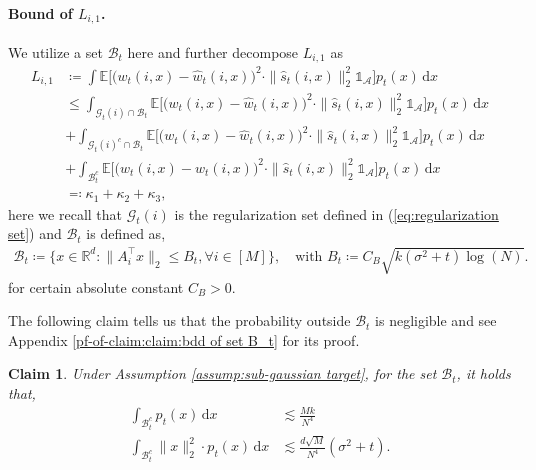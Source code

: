 \documentclass{article}
\newcommand{\ind}{\mathds{1}}
\newcommand{\defn}{\coloneqq}
\newcommand{\defnrev}{\eqqcolon}
\newcommand{\diff}{\,\mathrm{d}}
\theoremstyle{plain}
\newtheorem{claim}{\bf Claim}
\theoremstyle{remark}
\newtheorem{remark}{Remark}
\begin{document}
\paragraph*{Bound of $L_{i,1}$.}
We utilize a set $\mathcal{B}_t$ here and further decompose $L_{i,1}$ as
\begin{align*}
    L_{i,1} &\defn \int \mathbb{E} \Big[  \big(w_t(i,x)-\widehat{w}_t(i,x)\big)^2 \cdot \|\widehat{s}_t(i,x) \|_2^2 \ind_{\mathcal{A}}\Big] p_t(x) \! \diff x \\
    & \leq \int_{\mathcal{G}_{t}(i) \cap \mathcal{B}_t} \mathbb{E} \Big[  \big(w_t(i,x)-\widehat{w}_t(i,x)\big)^2 \cdot \|\widehat{s}_t(i,x) \|_2^2 \ind_{\mathcal{A}}\Big] p_t(x) \!\diff x  \\
    &+ \int_{\mathcal{G}_t(i)^c \cap \mathcal{B}_t} \mathbb{E} \Big[  \big(w_t(i,x)-\widehat{w}_t(i,x)\big)^2 \cdot \|\widehat{s}_t(i,x) \|_2^2 \ind_{\mathcal{A}}\Big] p_t(x) \!\diff x \\
    & + \int_{\mathcal{B}_t^c} \mathbb{E} \Big[  \big(w_t(i,x)-\widehat{w}_t(i,x)\big)^2 \cdot \|\widehat{s}_t(i,x) \|_2^2 \ind_{\mathcal{A}}\Big] p_t(x) \!\diff x \\
    &\defnrev \kappa_1 + \kappa_2 + \kappa_3,
\end{align*}
here we recall that $\mathcal{G}_t(i)$ is the regularization set defined in (\ref{eq:regularization set}) and $\mathcal{B}_t$ is defined as, 
\begin{align}
    \mathcal{B}_t \defn \Big\{ x \in \mathbb{R}^d: \| A_i^{\top} x\|_{2} \leq B_t, \forall i \in [M]\Big\}, \quad \text{with }B_t \defn C_B \sqrt{k(\sigma^2+t)\log (N)}. \label{eq:def of B_t}
\end{align}
for certain absolute constant $C_B>0$. 


The following claim tells us that the probability outside $\mathcal{B}_t$ is negligible and see Appendix \ref{pf-of-claim:claim:bdd of set B_t} for its proof. 
\begin{claim}
    \label{claim:bdd of set B_t}
    Under Assumption \ref{assump:sub-gaussian target}, for the set $\mathcal{B}_t$, it holds that, 
    \begin{align*}
        \int_{\mathcal{B}_t^c} p_t(x)\!\diff x &\lesssim \frac{Mk}{N^{4}}\\
        \int_{\mathcal{B}_t^c} \|x\|_2^2 \cdot p_t(x) \!\diff x &\lesssim \frac{d\sqrt{M}}{N^4} (\sigma^2+t).
    \end{align*}
\end{claim}
\end{document}
